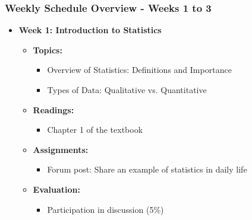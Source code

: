 \documentclass[aspectratio=169]{beamer}
\begin{document}
\begin{frame}[fragile]
    \frametitle{Weekly Schedule Overview - Weeks 1 to 3}
    \begin{itemize}
        \item \textbf{Week 1: Introduction to Statistics}
        \begin{itemize}
            \item \textbf{Topics:}
                \begin{itemize}
                    \item Overview of Statistics: Definitions and Importance
                    \item Types of Data: Qualitative vs. Quantitative
                \end{itemize}
            \item \textbf{Readings:}
                \begin{itemize}
                    \item Chapter 1 of the textbook
                \end{itemize}
            \item \textbf{Assignments:}
                \begin{itemize}
                    \item Forum post: Share an example of statistics in daily life
                \end{itemize}
            \item \textbf{Evaluation:}
                \begin{itemize}
                    \item Participation in discussion (5\%)
                \end{itemize}
        \end{itemize}
        

\end{itemize}
\end{frame}
\end{document}
